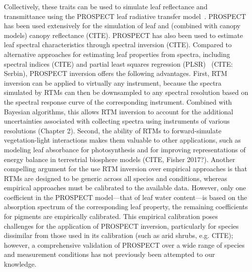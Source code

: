 Collectively, these traits can be used to simulate leaf reflectance and transmittance using the PROSPECT leaf radiative transfer model~\cite{jacquemoud1990_prospect,feret2008_prospect,feret2017_prospectd}.
%
PROSPECT has been used extensively for the simulation of leaf and (combined with canopy models) canopy reflectance (CITE).
PROSPECT has also been used to estimate leaf spectral characteristics through spectral inversion (CITE).
Compared to alternative approaches for estimating leaf properties from spectra, including spectral indices (CITE) and partial least squares regression (PLSR)~\cite{barnes_2017_beyond} (CITE: Serbin), PROSPECT inversion offers the following advantages.
First, RTM inversion can be applied to virtually any instrument, because the spectra simulated by RTMs can then be downsampled to any spectral resolution based on the spectral response curve of the corresponding instrument.
Combined with Bayesian algorithms, this allows RTM inversion to account for the additional uncertainties associated with collecting spectra using instruments of various resolutions (Chapter 2).
Second, the ability of RTMs to forward-simulate vegetation-light interactions makes them valuable to other applications, such as modeling leaf absorbance for photosynthesis and for improving representations of energy balance in terrestrial biosphere models (CITE, Fisher 2017?).
Another compelling argument for the use RTM inversion over empirical approaches is that RTMs are designed to be generic across all species and conditions, whereas empirical approaches must be calibrated to the available data.
% 
% 
However, only one coefficient in the PROSPECT model---that of leaf water content---is based on the absorption spectrum of the corresponding leaf property, the remaining coefficients for pigments are empirically calibrated.
% 
% 
This empirical calibration poses challenges for the application of PROSPECT inversion, particularly for species dissimilar from those used in its calibration (such as arid shrubs, e.g. CITE); however, a comprehensive validation of PROSPECT over a wide range of species and measurement conditions has not previously been attempted to our knowledge.
% 
% 
% 

